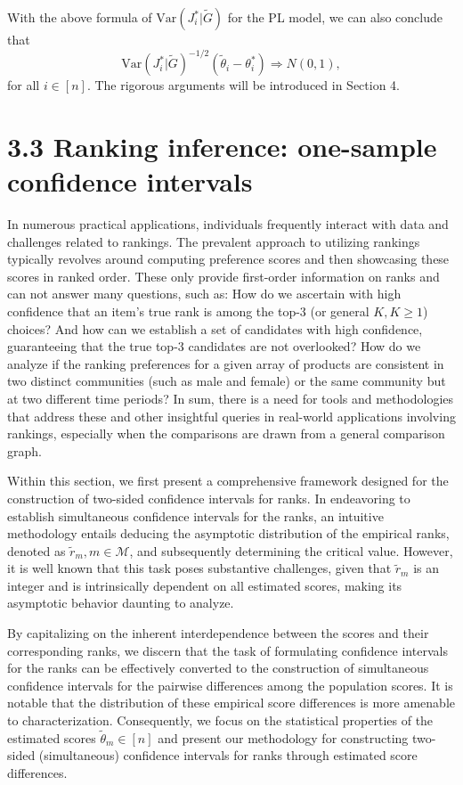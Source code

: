 With the above formula of \(\mathrm{Var}(J_i^* |\widetilde{G})\) for the PL model, we can also conclude that
\[
\mathrm{Var}(J_i^* |\widetilde{G})^{-1 / 2}(\widetilde{\theta}_i - \theta_i^*)\Rightarrow N(0,1),
\]
for all \(i\in [n]\). The rigorous arguments will be introduced in Section 4.

\section{3.3 Ranking inference: one-sample confidence intervals}\label{ranking-inference-one-sample-confidence-intervals}

In numerous practical applications, individuals frequently interact with data and challenges related to rankings. The prevalent approach to utilizing rankings typically revolves around computing preference scores and then showcasing these scores in ranked order. These only provide first-order information on ranks and can not answer many questions, such as: How do we ascertain with high confidence that an item's true rank is among the top-3 (or general \(K,K\geq 1\)) choices? And how can we establish a set of candidates with high confidence, guaranteeing that the true top-3 candidates are not overlooked? How do we analyze if the ranking preferences for a given array of products are consistent in two distinct communities (such as male and female) or the same community but at two different time periods? In sum, there is a need for tools and methodologies that address these and other insightful queries in real-world applications involving rankings, especially when the comparisons are drawn from a general comparison graph.

Within this section, we first present a comprehensive framework designed for the construction of two-sided confidence intervals for ranks. In endeavoring to establish simultaneous confidence intervals for the ranks, an intuitive methodology entails deducing the asymptotic distribution of the empirical ranks, denoted as \(\widetilde{r}_{m},m\in \mathcal{M}\), and subsequently determining the critical value. However, it is well known that this task poses substantive challenges, given that \(\widetilde{r}_{m}\) is an integer and is intrinsically dependent on all estimated scores, making its asymptotic behavior daunting to analyze.

By capitalizing on the inherent interdependence between the scores and their corresponding ranks, we discern that the task of formulating confidence intervals for the ranks can be effectively converted to the construction of simultaneous confidence intervals for the pairwise differences among the population scores. It is notable that the distribution of these empirical score differences is more amenable to characterization. Consequently, we focus on the statistical properties of the estimated scores \(\widetilde{\theta}_{m} \in [n]\) and present our methodology for constructing two-sided (simultaneous) confidence intervals for ranks through estimated score differences.

